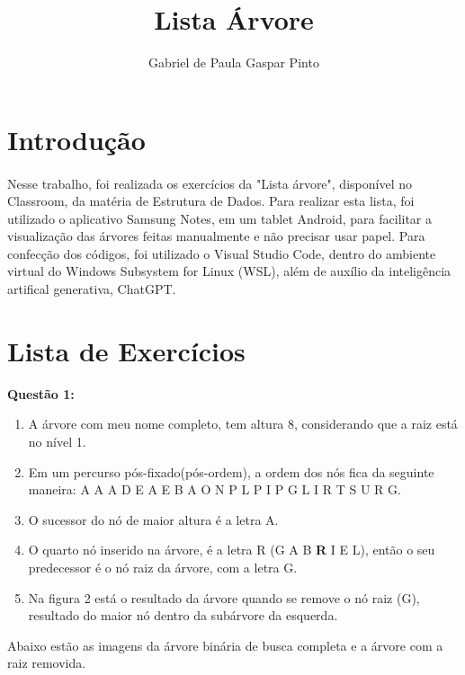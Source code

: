\documentclass{article}
\title{Lista Árvore}
\author{Gabriel de Paula Gaspar Pinto}
\date{}
\begin{document}
\maketitle

\section{Introdução}
\paragraph{}Nesse trabalho, foi realizada os exercícios da "Lista árvore", disponível no Classroom, da matéria de Estrutura de Dados. Para realizar esta lista, foi utilizado o aplicativo Samsung Notes, em um tablet Android, para facilitar a visualização das árvores feitas manualmente e não precisar usar papel. Para confecção dos códigos, foi utilizado o Visual Studio Code, dentro do ambiente virtual do Windows Subsystem for Linux (WSL), além de auxílio da inteligência artifical generativa, ChatGPT.

\section*{Lista de Exercícios}

\textbf{Questão 1:}

\begin{enumerate}[label=(\alph*)]
    \item A árvore com meu nome completo, tem altura 8, considerando que a raiz está no nível 1.
    \item Em um percurso pós-fixado(pós-ordem), a ordem dos nós fica da seguinte maneira:
    A A A D E A E B A O N P L P I P G L I R T S U R G.
    \item O sucessor do nó de maior altura é a letra A.
    \item O quarto nó inserido na árvore, é a letra R (G A B \textbf{R} I E L), então o seu predecessor é o nó raiz da árvore, com a letra G.
    \item Na figura 2 está o resultado da árvore quando se remove o nó raiz (G), resultado do maior nó dentro da subárvore da esquerda.
\end{enumerate}

Abaixo estão as imagens da árvore binária de busca completa e a árvore com a raiz removida.
\end{document}
